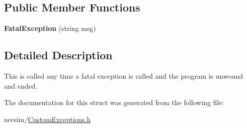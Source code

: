 \subsection*{Public Member Functions}
\begin{DoxyCompactItemize}
\item 
{\bfseries Fatal\+Exception} (string msg)\hypertarget{struct_fatal_exception_a0a95484803080c915b5a728b9ab863c6}{}\label{struct_fatal_exception_a0a95484803080c915b5a728b9ab863c6}

\end{DoxyCompactItemize}


\subsection{Detailed Description}
This is called any time a fatal exception is called and the program is unwound and ended. 

The documentation for this struct was generated from the following file\+:\begin{DoxyCompactItemize}
\item 
necsim/\hyperlink{_custom_exceptions_8h}{Custom\+Exceptions.\+h}\end{DoxyCompactItemize}
